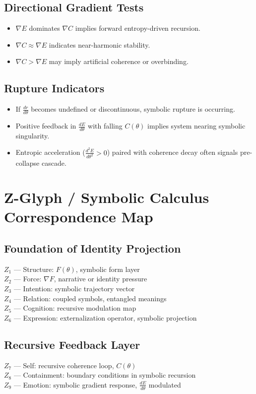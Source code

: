 \documentclass[12pt]{article}
\begin{document}
\subsection*{Directional Gradient Tests}
\begin{itemize}
  \item $\nabla E$ dominates $\nabla C$ implies forward entropy-driven recursion.
  \item $\nabla C \approx \nabla E$ indicates near-harmonic stability.
  \item $\nabla C > \nabla E$ may imply artificial coherence or overbinding.
\end{itemize}

\subsection*{Rupture Indicators}
\begin{itemize}
  \item If $\frac{dr}{d\theta}$ becomes undefined or discontinuous, symbolic rupture is occurring.
  \item Positive feedback in $\frac{dE}{d\theta}$ with falling $C(\theta)$ implies system nearing symbolic singularity.
  \item Entropic acceleration ($\frac{d^2E}{d\theta^2} > 0$) paired with coherence decay often signals pre-collapse cascade.
\end{itemize}

\section{Z-Glyph / Symbolic Calculus Correspondence Map}

\subsection*{Foundation of Identity Projection}
$Z_1$ — Structure: $F(\theta)$, symbolic form layer\\
$Z_2$ — Force: $\nabla F$, narrative or identity pressure\\
$Z_3$ — Intention: symbolic trajectory vector\\
$Z_4$ — Relation: coupled symbols, entangled meanings\\
$Z_5$ — Cognition: recursive modulation map\\
$Z_6$ — Expression: externalization operator, symbolic projection

\subsection*{Recursive Feedback Layer}
$Z_7$ — Self: recursive coherence loop, $C(\theta)$\\
$Z_8$ — Containment: boundary conditions in symbolic recursion\\
$Z_9$ — Emotion: symbolic gradient response, $\frac{dE}{d\theta}$ modulated
\end{document}
